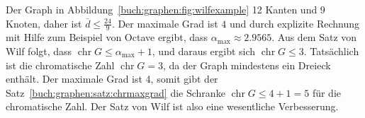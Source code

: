 \begin{beispiel}
Der Graph in Abbildung~\ref{buch:graphen:fig:wilfexample} 12 Kanten und 9
Knoten, daher ist $\overline{d}\le \frac{24}{9}$.
Der maximale Grad ist $4$ und durch explizite Rechnung mit Hilfe zum Beispiel
von Octave ergibt, dass $\alpha_{\text{max}}\approx 2.9565$.
Aus dem Satz von Wilf folgt, dass
$\operatorname{chr}G\le \alpha_{\text{max}}+1$, und daraus ergibt sich
$\operatorname{chr}G\le 3$.
Tatsächlich ist die chromatische Zahl $\operatorname{chr}G=3$, da 
der Graph mindestens ein Dreieck enthält.
Der maximale Grad ist 4, somit gibt der
Satz~\ref{buch:graphen:satz:chrmaxgrad}
die Schranke 
$\operatorname{chr}G\le 4+1=5$
für die chromatische Zahl.
Der Satz von Wilf ist also eine wesentliche Verbesserung.
\end{beispiel}



